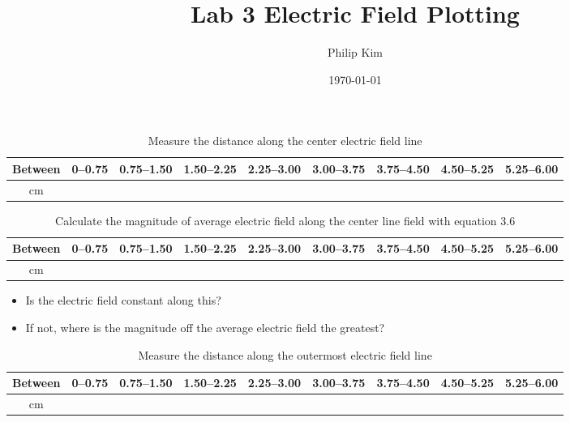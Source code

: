 \documentclass[a4paper]{article}
\title{Lab 3 Electric Field Plotting}
\author{Philip Kim}
\date{\today}
\begin{document}
\maketitle

\begin{table}[h!]
  \begin{center}
    \caption{Measure the distance along the center electric field line}\label{tab:table1}
    \begin{tabular}{|c|c|c|c|c|c|c|c|c|}\hline
      Between & 0--0.75 & 0.75--1.50 & 1.50--2.25 & 2.25--3.00 & 3.00--3.75 & 3.75--4.50 & 4.50--5.25 & 5.25--6.00 \\ \hline
      cm & & & & & & & & \\ \hline
    \end{tabular}
  \end{center}
\end{table}

\begin{table}[h!]
  \begin{center}
    \caption{Calculate the magnitude of average electric field along the center line field with equation 3.6}\label{tab:table1}
    \begin{tabular}{|c|c|c|c|c|c|c|c|c|}\hline
      Between & 0--0.75 & 0.75--1.50 & 1.50--2.25 & 2.25--3.00 & 3.00--3.75 & 3.75--4.50 & 4.50--5.25 & 5.25--6.00 \\ \hline
      cm & & & & & & & & \\ \hline
    \end{tabular}
  \end{center}
\end{table}
\begin{itemize}
  \item Is the electric field constant along this?
  \item If not, where is the magnitude off the average electric field the greatest?
\end{itemize}

\begin{table}[h!]
  \begin{center}
    \caption{Measure the distance along the outermost electric field line}\label{tab:table1}
    \begin{tabular}{|c|c|c|c|c|c|c|c|c|}\hline
      Between & 0--0.75 & 0.75--1.50 & 1.50--2.25 & 2.25--3.00 & 3.00--3.75 & 3.75--4.50 & 4.50--5.25 & 5.25--6.00 \\ \hline
      cm & & & & & & & & \\ \hline
    \end{tabular}
  \end{center}
\end{table}
\end{document}
